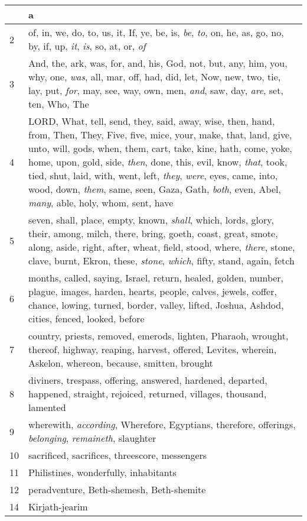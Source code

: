 \begin{longtable}{l|p{3.75in}}
\hline \hline
\endlastfoot
1 & a \\ \hline
2 & of, in, we, do, to, us, it, If, ye, be, is, \emph{be}, \emph{to}, on, he, as, go, no, by, if, up, \emph{it}, \emph{is}, so, at, or, \emph{of} \\ \hline
3 & And, the, ark, was, for, and, his, God, not, but, any, him, you, why, one, \emph{was}, all, mar, off, had, did, let, Now, new, two, tie, lay, put, \emph{for}, may, see, way, own, men, \emph{and}, saw, day, \emph{are}, set, ten, Who, The \\ \hline
4 & LORD, What, tell, send, they, said, away, wise, then, hand, from, Then, They, Five, five, mice, your, make, that, land, give, unto, will, gods, when, them, cart, take, kine, hath, come, yoke, home, upon, gold, side, \emph{then}, done, this, evil, know, \emph{that}, took, tied, shut, laid, with, went, left, \emph{they}, \emph{were}, eyes, came, into, wood, down, \emph{them}, same, seen, Gaza, Gath, \emph{both}, even, Abel, \emph{many}, able, holy, whom, sent, have \\ \hline
5 & seven, shall, place, empty, known, \emph{shall}, which, lords, glory, their, among, milch, there, bring, goeth, coast, great, smote, along, aside, right, after, wheat, field, stood, where, \emph{there}, stone, clave, burnt, Ekron, these, \emph{stone}, \emph{which}, fifty, stand, again, fetch \\ \hline
6 & months, called, saying, Israel, return, healed, golden, number, plague, images, harden, hearts, people, calves, jewels, coffer, chance, lowing, turned, border, valley, lifted, Joshua, Ashdod, cities, fenced, looked, before \\ \hline
7 & country, priests, removed, emerods, lighten, Pharaoh, wrought, thereof, highway, reaping, harvest, offered, Levites, wherein, Askelon, whereon, because, smitten, brought \\ \hline
8 & diviners, trespass, offering, answered, hardened, departed, happened, straight, rejoiced, returned, villages, thousand, lamented \\ \hline
9 & wherewith, \emph{according}, Wherefore, Egyptians, therefore, offerings, \emph{belonging}, \emph{remaineth}, slaughter \\ \hline
10 & sacrificed, sacrifices, threescore, messengers \\ \hline
11 & Philistines, wonderfully, inhabitants \\ \hline
12 & peradventure, Beth-shemesh, Beth-shemite \\ \hline
14 & Kirjath-jearim \\ \hline
\end{longtable}






